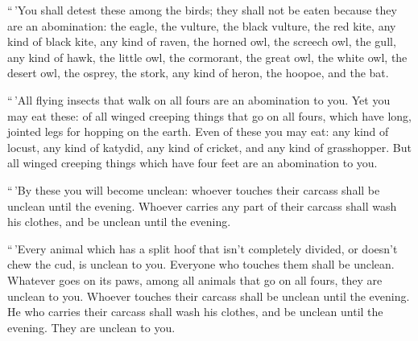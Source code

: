  ``\,'You shall detest these among the birds; they shall
not be eaten because they are an abomination: the eagle, the vulture,
the black vulture,  the red kite, any kind of black kite,
 any kind of raven,  the horned owl, the
screech owl, the gull, any kind of hawk,  the little owl,
the cormorant, the great owl,  the white owl, the desert
owl, the osprey,  the stork, any kind of heron, the
hoopoe, and the bat.

 ``\,'All flying insects that walk on all fours are an
abomination to you.  Yet you may eat these: of all winged
creeping things that go on all fours, which have long, jointed legs for
hopping on the earth.  Even of these you may eat: any
kind of locust, any kind of katydid, any kind of cricket, and any kind
of grasshopper.  But all winged creeping things which
have four feet are an abomination to you.

 ``\,'By these you will become unclean: whoever touches
their carcass shall be unclean until the evening. 
Whoever carries any part of their carcass shall wash his clothes, and be
unclean until the evening.

 ``\,'Every animal which has a split hoof that isn't
completely divided, or doesn't chew the cud, is unclean to you. Everyone
who touches them shall be unclean.  Whatever goes on its
paws, among all animals that go on all fours, they are unclean to you.
Whoever touches their carcass shall be unclean until the evening.
 He who carries their carcass shall wash his clothes, and
be unclean until the evening. They are unclean to you.


